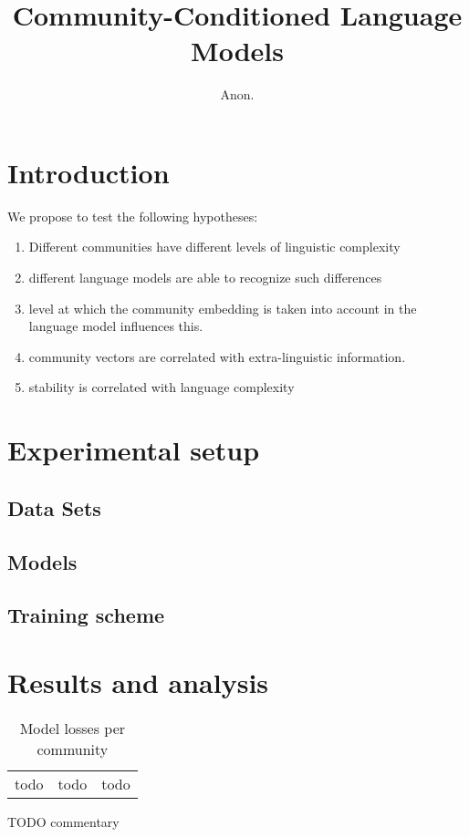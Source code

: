 \documentclass[11pt,a4paper]{article}
\title{Community-Conditioned Language Models}
\author{Anon.}
\date{}
\begin{document}
\maketitle
\begin{abstract}
\end{abstract}


\section{Introduction}

We propose to test the following hypotheses:

\begin{enumerate}
\item Different communities have different levels of linguistic
  complexity
\item different language models are able to recognize such differences
\item level at which the community embedding is taken into account in the language model influences this.
\item community vectors are correlated with extra-linguistic information.
\item stability is correlated with language complexity
\end{enumerate}

\section{Experimental setup}
\subsection{Data Sets}
\subsection{Models}
\subsection{Training scheme}

\section{Results and analysis}

\begin{table}
  \centering
  \begin{tabular}{ccc}
    todo &todo &todo 
  \end{tabular}
  \caption{Model losses per community}
  \label{tab:losses}
\end{table}
TODO commentary
\end{document}
